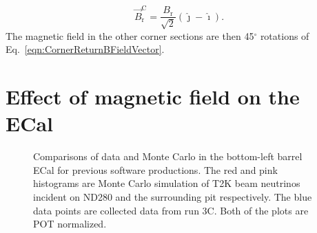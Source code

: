 \begin{equation}
  \overrightarrow{B}^{\textrm{C}}_{\textrm{r}} = \frac{B_{\textrm{r}}}{\sqrt{2}}(\hat{\jmath} - \hat{\imath}).
  \label{eqn:CornerReturnBFieldVector}
\end{equation}
The magnetic field in the other corner sections are then 45$^\circ$ rotations of Eq.~\ref{eqn:CornerReturnBFieldVector}.
\newline
\newline

\section{Effect of magnetic field on the ECal}
\label{sec:MagneticFieldEffect}
\begin{figure}%
  \centering

  \caption{Comparisons of data and Monte Carlo in the bottom-left barrel ECal for previous software productions.  The red and pink histograms are Monte Carlo simulation of T2K beam neutrinos incident on ND280 and the surrounding pit respectively.  The blue data points are collected data from run 3C.  Both of the plots are POT normalized.}
  \label{fig:BLBNoField}
\end{figure}

